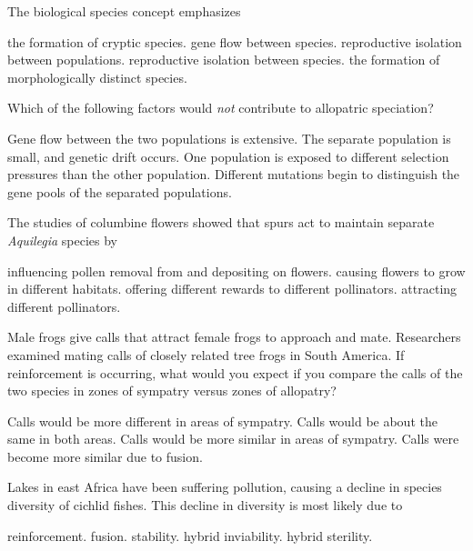 \question
The biological species concept emphasizes

\begin{choices}
	\choice the formation of cryptic species.%
	\choice gene flow between species.%
	\choice reproductive isolation between populations.%
	\correctchoice reproductive isolation between species.%
	\choice the formation of morphologically distinct species.%
\end{choices}

\question
Which of the following factors would \emph{not} contribute to allopatric speciation?

\begin{choices}
\correctchoice Gene flow between the two populations is extensive.   %
\choice The separate population is small, and genetic drift occurs.   %
\choice One population is exposed to different selection pressures than the other population.   %
\choice Different mutations begin to distinguish the gene pools of the separated populations.   %
\end{choices}



\question
The studies of columbine flowers showed that spurs act to maintain separate \textit{Aquilegia} species by

\begin{choices}
	\correctchoice influencing pollen removal from and depositing on flowers. %
	\choice causing flowers to grow in different habitats. %
	\choice offering different rewards to different pollinators. %
	\choice attracting different pollinators. %
\end{choices}

\question
Male frogs give calls that attract female frogs to approach and mate. Researchers examined mating calls of closely related tree frogs in South America. If reinforcement is occurring, what would you expect if you compare the calls of the two species in zones of sympatry versus zones of allopatry? 

\begin{choices}
	\correctchoice Calls would be more different in areas of sympatry. %
	\choice Calls would be about the same in both areas. %
	\choice Calls would be more similar in areas of sympatry. %
	\choice Calls were become more similar due to fusion. %
\end{choices}

\question
Lakes in east Africa have been suffering pollution, causing a decline in species diversity of cichlid fishes. This decline in diversity is most likely due to

\begin{choices}
	\choice reinforcement. %
	\correctchoice fusion. %
	\choice stability. %
	\choice hybrid inviability. %
	\choice hybrid sterility. %
\end{choices}

